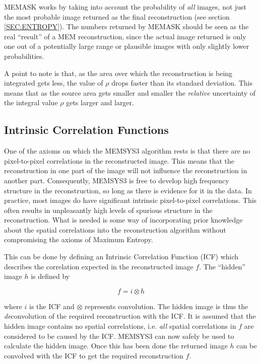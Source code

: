 MEMASK works by taking into account the probability of {\em all} images, not
just  the most probable image returned as the final reconstruction (see section
\ref  {SEC:ENTROPY}). The numbers returned by MEMASK should be seen as the real 
``result'' of a MEM reconstruction, since the actual image returned is only one 
out of a potentially large range or plausible images with only slightly lower 
probabilities.

A point to note is that, as the area over which the reconstruction is being 
integrated gets less, the value of $\rho$ drops faster than its standard 
deviation. This means that as the source area gets smaller and smaller the 
{\em relative} uncertainty of the integral value $\rho$ gets larger and larger.

\subsection {Intrinsic Correlation Functions}

One of the axioms on which the MEMSYS3 algorithm rests is that there are no 
pixel-to-pixel correlations in the reconstructed image. This means that the 
reconstruction in one part of the image will not influence the reconstruction
in  another part. Consequently, MEMSYS3 is free to develop high frequency 
structure in the reconstruction, so long as there is evidence for it in the 
data. In practice, most images do have significant intrinsic pixel-to-pixel 
correlations. This often results in unpleasantly high levels of spurious 
structure in the reconstruction. What is needed is some way of incorporating
prior knowledge about  the spatial correlations into the reconstruction
algorithm without compromising  the axioms of Maximum Entropy.

This can be done by defining an Intrinsic Correlation Function (ICF) which 
describes the correlation expected in the reconstructed image $f$. The 
``hidden'' image $h$ is defined by

\begin {equation}
 f = i \otimes h
\end {equation}

where $i$ is the ICF and $\otimes$ represents convolution. The hidden image is 
thus the {\em de}convolution of the required reconstruction with the ICF. It is
assumed that the hidden image contains no spatial correlations, i.e. {\em all}
spatial correlations in $f$ are considered to be caused by the ICF. MEMSYS3 can 
now safely be used to calculate the hidden image. Once this has been done the 
returned image $h$ can be convolved with the ICF to get the required 
reconstruction $f$. 

